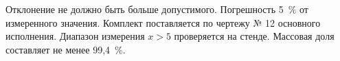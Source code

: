 Отклонение не должно быть больше допустимого.
Погрешность 5~\% от измеренного значения.
Комплект поставляется по чертежу № 12 основного исполнения.
Диапазон измерения $x > 5$ проверяется на стенде.
Массовая доля составляет не менее 99,4~\%.
